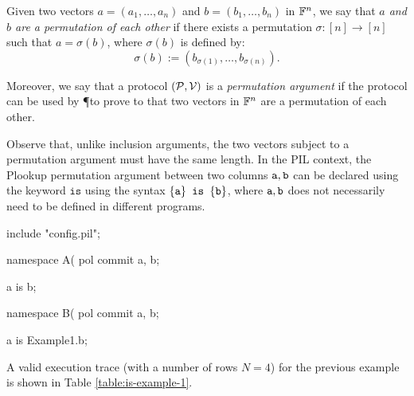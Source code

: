 \begin{definition}
    Given two vectors $a = (a_1, \dots, a_n)$ and $b = (b_1, \dots, b_n)$ in $\mathbb{F}^n$, we say that \textit{$a$ and $b$ are a permutation of each other} if there exists a permutation $\sigma \colon [n] \to [n]$ such that $a = \sigma(b)$, where $\sigma(b)$ is defined by:
    \[
    \sigma(b) := (b_{\sigma(1)}, \dots, b_{\sigma(n)}).
    \]
    
    Moreover, we say that a protocol $(\mathcal{P},\mathcal{V})$ is a \textit{permutation argument} if the protocol can be used by \P to prove to \V that two vectors in $\mathbb{F}^n$ are a permutation of each other.
\end{definition}
Observe that, unlike inclusion arguments, the two vectors subject to a permutation argument must have the same length.
In the PIL context, the Plookup permutation argument between two columns $\mathtt{a},\mathtt{b}$ can be declared using the keyword $\texttt{is}$ using the syntax $\{\mathtt{a}\} \texttt{ is } \{\mathtt{b}\}$, where $\mathtt{a},\mathtt{b}$ does not necessarily need to be defined in different programs. 
\begin{pil}
    include "config.pil";
    
    namespace A(%
    pol commit a, b;
    
    {a} is {b};
    
    namespace B(%
    pol commit a, b;
    
    {a} is {Example1.b};
\end{pil}
A valid execution trace (with a number of rows $N=4$) for the previous example is shown in Table \ref{table:is-example-1}.
